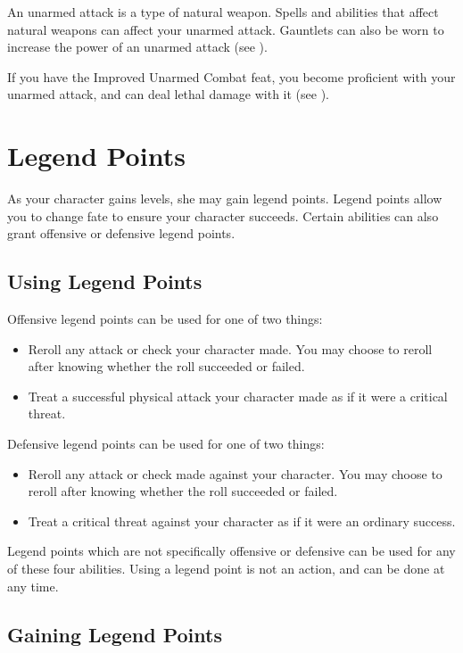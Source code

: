An unarmed attack is a type of natural weapon. Spells and abilities that affect natural weapons can affect your unarmed attack. Gauntlets can also be worn to increase the power of an unarmed attack (see ).

If you have the Improved Unarmed Combat feat, you become proficient with your unarmed attack, and can deal lethal damage with it (see ).
\section{Legend Points}\label{Legend Points}

As your character gains levels, she may gain legend points. Legend points allow you to change fate to ensure your character succeeds. Certain abilities can also grant offensive or defensive legend points.

\subsection{Using Legend Points}

Offensive legend points can be used for one of two things:
\begin{itemize}
    \item Reroll any attack or check your character made. You may choose to reroll after knowing whether the roll succeeded or failed.
    \item Treat a successful physical attack your character made as if it were a critical threat.
\end{itemize}

Defensive legend points can be used for one of two things:
\begin{itemize}
    \item Reroll any attack or check made against your character. You may choose to reroll after knowing whether the roll succeeded or failed.
    \item Treat a critical threat against your character as if it were an ordinary success.
\end{itemize}

Legend points which are not specifically offensive or defensive can be used for any of these four abilities. Using a legend point is not an action, and can be done at any time.

\subsection{Gaining Legend Points}

